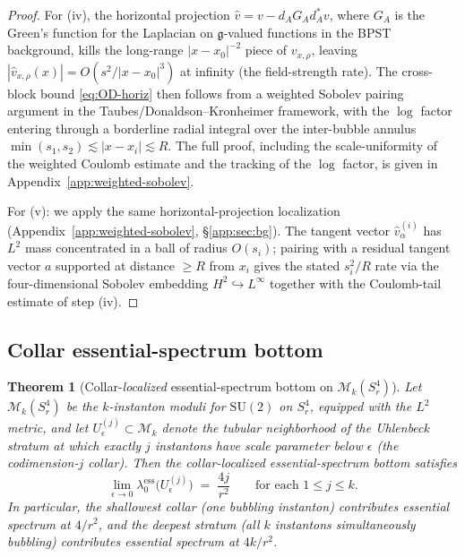 \documentclass[11pt,letterpaper]{article}
\newtheorem{theorem}{Theorem}[section]
\theoremstyle{definition}
\newcommand{\cM}{\mathcal{M}}
\newcommand{\fg}{\mathfrak{g}}
\begin{document}
\begin{proof}
For (iv), the horizontal projection $\hat{v} = v - d_{A} G_A d_A^* v$, where $G_A$ is the Green's function for the Laplacian on $\fg$-valued functions in the BPST background, kills the long-range $|x-x_0|^{-2}$ piece of $v_{x,\rho}$, leaving $|\hat{v}_{x,\rho}(x)| = O(s^2/|x-x_0|^3)$ at infinity (the field-strength rate). The cross-block bound \eqref{eq:OD-horiz} then follows from a weighted Sobolev pairing argument in the Taubes/Donaldson--Kronheimer framework, with the $\log$ factor entering through a borderline radial integral over the inter-bubble annulus $\min(s_1,s_2) \lesssim |x-x_i| \lesssim R$. The full proof, including the scale-uniformity of the weighted Coulomb estimate and the tracking of the $\log$ factor, is given in Appendix~\ref{app:weighted-sobolev}.

For (v): we apply the same horizontal-projection localization (Appendix~\ref{app:weighted-sobolev}, \S\ref{app:sec:bg}). The tangent vector $\hat{v}_\alpha^{(i)}$ has $L^2$ mass concentrated in a ball of radius $O(s_i)$; pairing with a residual tangent vector $a$ supported at distance $\ge R$ from $x_i$ gives the stated $s_i^2/R$ rate via the four-dimensional Sobolev embedding $H^2 \hookrightarrow L^\infty$ together with the Coulomb-tail estimate of step (iv).
\end{proof}

\subsection{Collar essential-spectrum bottom}

\begin{theorem}[Collar-\emph{localized} essential-spectrum bottom on $\cM_k(S^4_r)$]\label{thm:M_k-collar-conditional}
Let $\cM_k(S^4_r)$ be the $k$-instanton moduli for $\mathrm{SU}(2)$ on $S^4_r$, equipped with the $L^2$ metric, and let $U_\epsilon^{(j)} \subset \cM_k$ denote the tubular neighborhood of the Uhlenbeck stratum at which exactly $j$ instantons have scale parameter below $\epsilon$ (the codimension-$j$ collar). Then the collar-\emph{localized} essential-spectrum bottom satisfies
\[
\lim_{\epsilon \to 0}\lambda_0^{\mathrm{ess}}\bigl(U_\epsilon^{(j)}\bigr) \;=\; \frac{4j}{r^2}\qquad\text{for each } 1 \le j \le k.
\]
In particular, the shallowest collar (one bubbling instanton) contributes essential spectrum at $4/r^2$, and the deepest stratum (all $k$ instantons simultaneously bubbling) contributes essential spectrum at $4k/r^2$.
\end{theorem}
\end{document}
